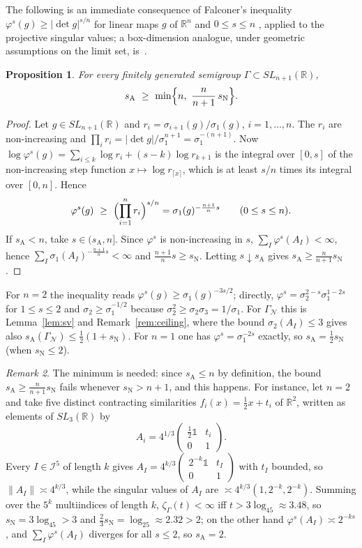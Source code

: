 \documentclass[11pt]{amsart}
\newcommand{\id}{\mathds{1}}
\newtheorem{proposition}{Proposition}[section]
\theoremstyle{definition}
\theoremstyle{remark}
\newtheorem{remark}[proposition]{Remark}
\newcommand{\R}{\mathbb R}
\newcommand{\cI}{\mathcal I}
\newcommand{\GN}{\Gamma_{\mathcal N}}
\newcommand{\sN}{s_{\mathrm N}}
\newcommand{\sA}{s_{\mathrm A}}
\newcommand{\abs}[1]{\lvert #1\rvert}
\newcommand{\norm}[1]{\lVert #1\rVert}
\begin{document}
\medskip
The following is an immediate consequence of Falconer's inequality $\varphi^s(g)\ge\abs{\det g}^{s/n}$ for linear maps $g$ of $\R^n$ and $0\le s\le n$ \cite{Fal88}, applied to the projective singular values; a box-dimension analogue, under geometric assumptions on the limit set, is~\cite[Thm.~1.8]{Sew23}.

\begin{proposition}\label{prop:main}
For every finitely generated semigroup $\Gamma\subset SL_{n+1}(\R)$,
\[
  \sA\ \ge\ \min\Bigl\{n,\ \frac{n}{n+1}\,\sN\Bigr\}.
\]
\end{proposition}

\begin{proof}
Let $g\in SL_{n+1}(\R)$ and $r_i=\sigma_{i+1}(g)/\sigma_1(g)$, $i=1,\dots,n$. The
$r_i$ are non-increasing and $\prod_ir_i=\abs{\det g}/\sigma_1^{n+1}=\sigma_1^{-(n+1)}$.
Now $\log\varphi^s(g)=\sum_{i\le k}\log r_i+(s-k)\log r_{k+1}$ is the integral over
$[0,s]$ of the non-increasing step function $x\mapsto\log r_{\lceil x\rceil}$, which
is at least $s/n$ times its integral over $[0,n]$. Hence
\[
  \varphi^s(g)\ \ge\ \Bigl(\prod_{i=1}^nr_i\Bigr)^{s/n}=\sigma_1(g)^{-\frac{n+1}{n}s}
  \qquad(0\le s\le n).
\]
If $\sA<n$, take $s\in(\sA,n]$. Since $\varphi^s$ is non-increasing in $s$,
$\sum_I\varphi^s(A_I)<\infty$, hence $\sum_I\sigma_1(A_I)^{-\frac{n+1}{n}s}<\infty$
and $\frac{n+1}{n}s\ge\sN$. Letting $s\downarrow\sA$ gives $\sA\ge\frac{n}{n+1}\sN$.
\end{proof}

For $n=2$ the inequality reads $\varphi^s(g)\ge\sigma_1(g)^{-3s/2}$; directly,
$\varphi^s=\sigma_2^{2-s}\sigma_1^{1-2s}$ for $1\le s\le2$ and $\sigma_2\ge\sigma_1^{-1/2}$
because $\sigma_2^2\ge\sigma_2\sigma_3=1/\sigma_1$. For $\GN$ this is Lemma~\ref{lem:sv} and Remark~\ref{rem:ceiling}, where the bound $\sigma_2(A_I)\le3$ gives also $\sA(\GN)\le\frac12(1+\sN)$. For $n=1$ one has
$\varphi^s=\sigma_1^{-2s}$ exactly, so $\sA=\frac12\sN$ (when $\sN\le2$).

\begin{remark}\label{rem:minneeded}
The minimum is needed: since $\sA\le n$ by definition, the bound
$\sA\ge\frac{n}{n+1}\sN$ fails whenever $\sN>n+1$, and this happens. For instance,
let $n=2$ and take five distinct contracting similarities $f_i(x)=\frac12x+t_i$ of
$\R^2$, written as elements of $SL_3(\R)$ by
\[
  A_i=4^{1/3}\begin{pmatrix}\frac12\id&t_i\\0&1\end{pmatrix}.
\]
Every $I\in\cI^5$ of length $k$ gives
$A_I=4^{k/3}\begin{pmatrix}2^{-k}\id&t_I\\0&1\end{pmatrix}$ with $t_I$ bounded, so
$\norm{A_I}\asymp4^{k/3}$, while the singular values of $A_I$ are
$\asymp4^{k/3}(1,2^{-k},2^{-k})$. Summing over the $5^k$ multiindices of length $k$,
$\zeta_\Gamma(t)<\infty$ iff $t>3\log_45\approx3.48$, so $\sN=3\log_45>3$
and $\frac23\sN=\log_25\approx2.32>2$; on the other hand
$\varphi^s(A_I)\asymp2^{-ks}$, and $\sum_I\varphi^s(A_I)$ diverges for all
$s\le2$, so $\sA=2$.
\end{remark}
\end{document}
